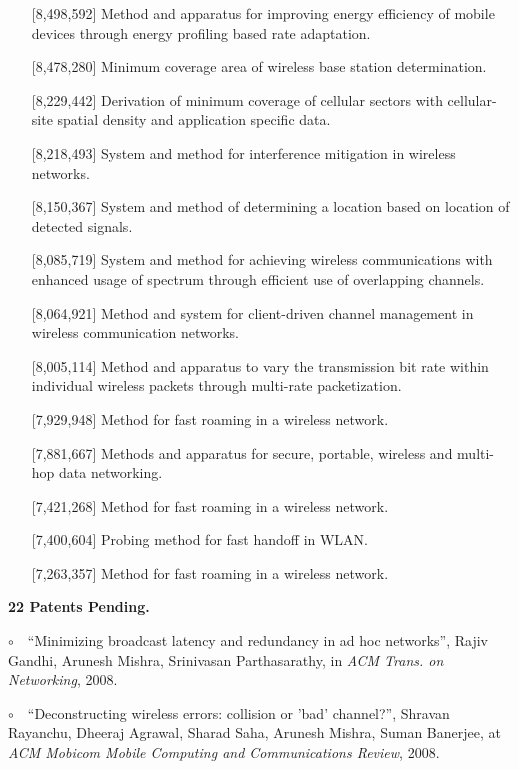 \begin{resume}
\begin{itemize}
       \item [] [8,498,592] Method and apparatus for improving energy efficiency of mobile devices through energy
           profiling based rate adaptation.
       \item [] [8,478,280] Minimum coverage area of wireless base station determination.
       \item [] [8,229,442] Derivation of minimum coverage of cellular sectors with cellular-site spatial density and
           application specific data.
       \item [] [8,218,493] System and method for interference mitigation in wireless networks.
       \item [] [8,150,367] System and method of determining a location based on location of detected signals.
       \item [] [8,085,719] System and method for achieving wireless communications with enhanced usage of spectrum
           through efficient use of overlapping channels.
       \item [] [8,064,921] Method and system for client-driven channel management in wireless communication networks.
       \item [] [8,005,114] Method and apparatus to vary the transmission bit rate within individual wireless packets
           through multi-rate packetization.
       \item [] [7,929,948] Method for fast roaming in a wireless network.
       \item [] [7,881,667] Methods and apparatus for secure, portable, wireless and multi-hop data networking.
       \item [] [7,421,268] Method for fast roaming in a wireless network.
       \item [] [7,400,604] Probing method for fast handoff in WLAN.
       \item [] [7,263,357] Method for fast roaming in a wireless network.
     \end{itemize}

{\bf 22 Patents Pending.}

\newcommand{\mybullet}{\noindent$\circ$~~}
\vspace{-0.7cm}

\mybullet ``Minimizing broadcast latency and redundancy in ad hoc networks'', Rajiv Gandhi, Arunesh Mishra, Srinivasan Parthasarathy, in
{\em ACM Trans. on Networking}, 2008.

\mybullet ``Deconstructing wireless errors: collision or 'bad' channel?'', Shravan  Rayanchu, Dheeraj Agrawal, Sharad Saha, Arunesh Mishra, Suman Banerjee,
at {\em ACM Mobicom Mobile Computing and Communications Review}, 2008.


\end{resume}
